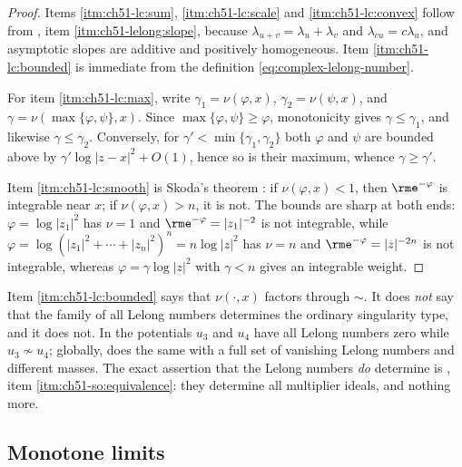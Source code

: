 \begin{proof}
Items \cref{itm:ch51-lc:sum}, \cref{itm:ch51-lc:scale} and
\cref{itm:ch51-lc:convex} follow from
, item \cref{itm:ch51-lelong:slope}, because
\(\lambda_{u+v}=\lambda_u+\lambda_v\) and
\(\lambda_{cu}=c\lambda_u\), and asymptotic slopes are additive and
positively homogeneous.  Item \cref{itm:ch51-lc:bounded} is immediate from
the definition \eqref{eq:complex-lelong-number}.

For item \cref{itm:ch51-lc:max}, write \(\gamma_1=\nu(\varphi,x)\),
\(\gamma_2=\nu(\psi,x)\), and \(\gamma=\nu(\max\{\varphi,\psi\},x)\).
Since \(\max\{\varphi,\psi\}\geq\varphi\), monotonicity gives
\(\gamma\leq\gamma_1\), and likewise \(\gamma\leq\gamma_2\).  Conversely,
for \(\gamma'<\min\{\gamma_1,\gamma_2\}\) both \(\varphi\) and \(\psi\)
are bounded above by \(\gamma'\log|z-x|^2+O(1)\), hence so is their
maximum, whence \(\gamma\geq\gamma'\).

Item \cref{itm:ch51-lc:smooth} is Skoda's theorem \cite{Sko72}: if
\(\nu(\varphi,x)<1\), then \(\rme^{-\varphi}\) is integrable near \(x\);
if \(\nu(\varphi,x)>n\), it is not.  The bounds are sharp at both ends:
\(\varphi=\log|z_1|^2\) has \(\nu=1\) and \(\rme^{-\varphi}=|z_1|^{-2}\)
is not integrable, while
\(\varphi=\log(|z_1|^2+\cdots+|z_n|^2)^n=n\log|z|^2\) has \(\nu=n\) and
\(\rme^{-\varphi}=|z|^{-2n}\) is not integrable, whereas
\(\varphi=\gamma\log|z|^2\) with \(\gamma<n\) gives an integrable weight.
\end{proof}

\begin{remark}
\label{rem:ch51-lelong-not-faithful}
Item \cref{itm:ch51-lc:bounded} says that \(\nu(\cdot,x)\) factors through
\(\sim\).  It does \emph{not} say that the family of all Lelong numbers
determines the ordinary singularity type, and it does not.  In
 the potentials \(u_3\) and \(u_4\) have
all Lelong numbers zero while \(u_3\not\sim u_4\); globally,
 does the same with a full set of vanishing Lelong
numbers and different masses.  The exact assertion that the Lelong numbers
\emph{do} determine is , item
\cref{itm:ch51-so:equivalence}: they determine all multiplier ideals, and
nothing more.
\end{remark}

\subsection{Monotone limits}
\label{sec:ch51-lelong-monotone}

